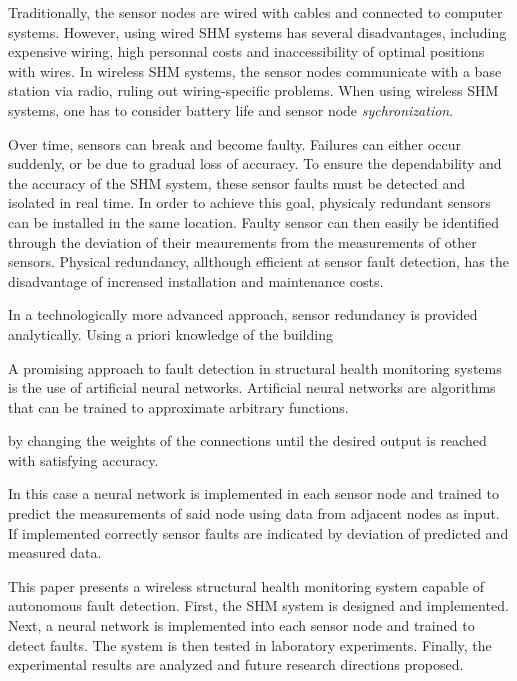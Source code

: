 \documentclass[12pt]{scrartcl}
\begin{document}
Traditionally, the sensor nodes are wired with cables and connected to computer systems.
However, using wired SHM systems has several disadvantages, including expensive wiring, high personnal costs and inaccessibility of optimal positions with wires.
In wireless SHM systems, the sensor nodes communicate with a base station via radio, ruling out wiring-specific problems.
When using wireless SHM systems, one has to consider battery life and sensor node \textit{sychronization}.

Over time, sensors can break and become faulty. Failures can either occur suddenly, or be due to gradual loss of accuracy.
To ensure the dependability and the accuracy of the SHM system, these sensor faults must be detected and isolated in real time. 
In order to achieve this goal, physicaly redundant sensors can be installed in the same location.
Faulty sensor can then easily be identified through the deviation of their meaurements from the measurements of other sensors.
Physical redundancy, allthough efficient at sensor fault detection, has the disadvantage of increased installation and maintenance costs.

In a technologically more advanced approach, sensor redundancy is provided analytically.
Using a priori knowledge of the building 


A promising approach to fault detection in structural health monitoring systems is the use of artificial neural networks.
Artificial neural networks are algorithms that can be trained to approximate arbitrary functions.

 by changing the weights of the connections until the desired output is reached with satisfying accuracy.

In this case a neural network is implemented in each sensor node and trained to predict the measurements of said node using data from adjacent nodes as input.
If implemented correctly sensor faults are indicated by deviation of predicted and measured data.

This paper presents a wireless structural health monitoring system capable of autonomous fault detection. 
First, the SHM system is designed and implemented. 
Next, a neural network is implemented into each sensor node and trained to detect faults. 
The system is then tested in laboratory experiments. 
Finally, the experimental results are analyzed and future research directions proposed.
\end{document}

